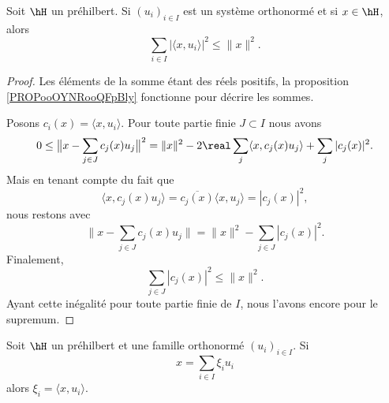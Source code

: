 \begin{proposition}    \label{PropHKqVHj}
	Soit \( \hH\) un préhilbert. Si \( (u_i)_{i\in I}\) est un système orthonormé et si \( x\in \hH\), alors
	\begin{equation}        \label{EQooWCYZooOPzGaw}
		\sum_{i\in I}\big| \langle x, u_i\rangle  \big|^2\leq \| x \|^2.
	\end{equation}
\end{proposition}

\begin{proof}
    Les éléments de la somme étant des réels positifs, la proposition \ref{PROPooOYNRooQFpBly} fonctionne pour décrire les sommes.

	Posons \( c_i(x)=\langle x, u_i\rangle \). Pour toute partie finie \( J\subset I\) nous avons
	\begin{equation}
		0\leq \big\| x-\sum_{j\in J}c_j(x)u_j \big\|^2=\| x \|^2-2\real\sum_{j}\langle x, c_j(x)u_j\rangle +\sum_j| c_j(x) |^2.
	\end{equation}
	Mais en tenant compte du fait que
	\begin{equation}
		\langle x, c_j(x)u_j\rangle =\overline{  c_j(x)}\langle x, u_j\rangle =| c_j(x) |^2,
	\end{equation}
	nous restons avec
	\begin{equation}    \label{EqvwXWEA}
		\| x-\sum_{j\in J}c_j(x)u_j \|=\| x \|^2-\sum_{j\in J}| c_j(x) |^2.
	\end{equation}
	Finalement,
	\begin{equation}
		\sum_{j\in J}| c_j(x) |^2\leq \| x \|^2.
	\end{equation}
	Ayant cette inégalité pour toute partie finie de \( I\), nous l'avons encore pour le supremum.
\end{proof}

\begin{proposition}     \label{PROPooWTOZooYZdlml}
	Soit \( \hH\) un préhilbert et une famille orthonormé \( (u_i)_{i\in I} \). Si
	\begin{equation}        \label{EqitrzXi}
		x=\sum_{i\in I}\xi_iu_i
	\end{equation}
	alors \( \xi_i=\langle x, u_i\rangle \).
\end{proposition}


